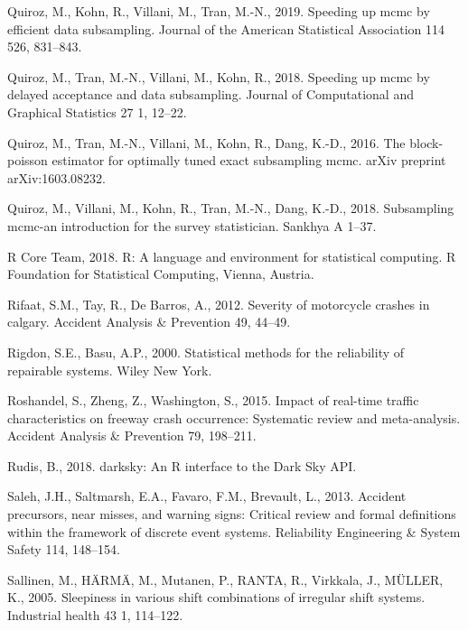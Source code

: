 \documentclass[12pt]{book}
\numberwithin{equation}{chapter}
\begin{document}
\leavevmode\hypertarget{ref-quiroz2019speeding}{}%
Quiroz, M., Kohn, R., Villani, M., Tran, M.-N., 2019. Speeding up mcmc by efficient data subsampling. Journal of the American Statistical Association 114 526, 831--843.

\leavevmode\hypertarget{ref-quiroz2018speeding}{}%
Quiroz, M., Tran, M.-N., Villani, M., Kohn, R., 2018. Speeding up mcmc by delayed acceptance and data subsampling. Journal of Computational and Graphical Statistics 27 1, 12--22.

\leavevmode\hypertarget{ref-quiroz2016block}{}%
Quiroz, M., Tran, M.-N., Villani, M., Kohn, R., Dang, K.-D., 2016. The block-poisson estimator for optimally tuned exact subsampling mcmc. arXiv preprint arXiv:1603.08232.

\leavevmode\hypertarget{ref-quiroz2018subsampling}{}%
Quiroz, M., Villani, M., Kohn, R., Tran, M.-N., Dang, K.-D., 2018. Subsampling mcmc-an introduction for the survey statistician. Sankhya A 1--37.

\leavevmode\hypertarget{ref-Rcitation}{}%
R Core Team, 2018. R: A language and environment for statistical computing. R Foundation for Statistical Computing, Vienna, Austria.

\leavevmode\hypertarget{ref-rifaat2012severity}{}%
Rifaat, S.M., Tay, R., De Barros, A., 2012. Severity of motorcycle crashes in calgary. Accident Analysis \& Prevention 49, 44--49.

\leavevmode\hypertarget{ref-rigdon2000statistical}{}%
Rigdon, S.E., Basu, A.P., 2000. Statistical methods for the reliability of repairable systems. Wiley New York.

\leavevmode\hypertarget{ref-roshandel2015impact}{}%
Roshandel, S., Zheng, Z., Washington, S., 2015. Impact of real-time traffic characteristics on freeway crash occurrence: Systematic review and meta-analysis. Accident Analysis \& Prevention 79, 198--211.

\leavevmode\hypertarget{ref-hrbrmstr}{}%
Rudis, B., 2018. darksky: An R interface to the Dark Sky API.

\leavevmode\hypertarget{ref-saleh2013accident}{}%
Saleh, J.H., Saltmarsh, E.A., Favaro, F.M., Brevault, L., 2013. Accident precursors, near misses, and warning signs: Critical review and formal definitions within the framework of discrete event systems. Reliability Engineering \& System Safety 114, 148--154.

\leavevmode\hypertarget{ref-sallinen2005sleepiness}{}%
Sallinen, M., HÄRMÄ, M., Mutanen, P., RANTA, R., Virkkala, J., MÜLLER, K., 2005. Sleepiness in various shift combinations of irregular shift systems. Industrial health 43 1, 114--122.
\end{document}
